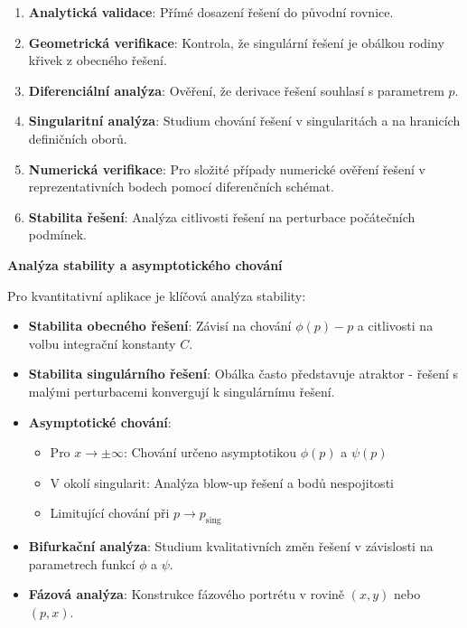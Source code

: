 \begin{enumerate}
\item \textbf{Analytická validace}: Přímé dosazení řešení do původní rovnice.

\item \textbf{Geometrická verifikace}: Kontrola, že singulární řešení je obálkou rodiny křivek z obecného řešení.

\item \textbf{Diferenciální analýza}: Ověření, že derivace řešení souhlasí s parametrem $p$.

\item \textbf{Singularitní analýza}: Studium chování řešení v singularitách a na hranicích definičních oborů.

\item \textbf{Numerická verifikace}: Pro složité případy numerické ověření řešení v reprezentativních bodech pomocí diferenčních schémat.

\item \textbf{Stabilita řešení}: Analýza citlivosti řešení na perturbace počátečních podmínek.
\end{enumerate}

\vspace{1\baselineskip}

\noindent\textbf{Analýza stability a asymptotického chování}

Pro kvantitativní aplikace je klíčová analýza stability:

\begin{itemize}
\item \textbf{Stabilita obecného řešení}: Závisí na chování $\phi(p) - p$ a citlivosti na volbu integrační konstanty $C$.

\item \textbf{Stabilita singulárního řešení}: Obálka často představuje atraktor - řešení s malými perturbacemi konvergují k singulárnímu řešení.

\item \textbf{Asymptotické chování}: 
\begin{itemize}
\item Pro $x \to \pm\infty$: Chování určeno asymptotikou $\phi(p)$ a $\psi(p)$
\item V okolí singularit: Analýza blow-up řešení a bodů nespojitosti
\item Limitující chování při $p \to p_{\text{sing}}$
\end{itemize}

\item \textbf{Bifurkační analýza}: Studium kvalitativních změn řešení v závislosti na parametrech funkcí $\phi$ a $\psi$.

\item \textbf{Fázová analýza}: Konstrukce fázového portrétu v rovině $(x, y)$ nebo $(p, x)$.
\end{itemize}

